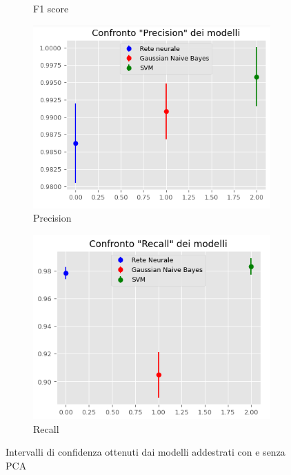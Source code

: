 \begin{figure}[!ht]
\begin{subfigure}[b]{0.4\textwidth}
        \caption{F1 score}
        \label{fig:f1_pca}
    \end{subfigure}
    \hfill
    \begin{subfigure}[b]{0.4\textwidth}
        \centering
        \includegraphics[width=\textwidth]{img/ris/precision_inter_pca.png}
        \caption{Precision}
        \label{fig:precision_pca}
    \end{subfigure}
    \hfill
    \begin{subfigure}[b]{0.4\textwidth}
        \centering
        \includegraphics[width=\textwidth]{img/ris/recall_inter_pca.png}
        \caption{Recall}
        \label{fig:recall_pca}
    \end{subfigure}
    \caption{Intervalli di confidenza ottenuti dai modelli addestrati con e senza PCA}
    \label{fig:intervalli_confidenza_pca}
\end{figure}